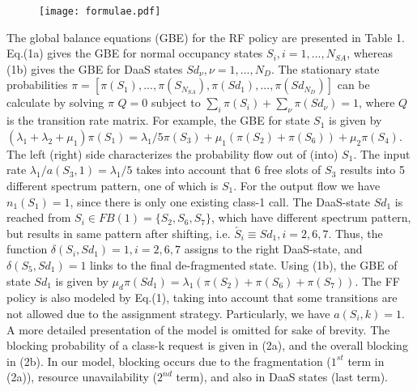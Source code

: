 \documentclass[letterpaper,10pt]{article}
\begin{document}
\vspace{-3mm}
\begin{figure}[ht!]
 \centering
\texttt{[image: formulae.pdf]}
\label{table:formulae}\vspace{-7mm}
\end{figure}
The global balance equations (GBE) for the RF policy are presented in Table 1. Eq.(1a) gives the GBE for normal occupancy states $S_i, i=1,...,N_{SA}$, whereas (1b) gives the GBE for DaaS states $Sd_\nu, \nu=1,...,N_D$. The stationary state probabilities  $\pi = [ \pi(S_1),...,\pi(S_{N_{SA}}), \pi(Sd_1),...,\pi(Sd_{N_D})]$ can be calculate by solving $\pi$ $Q=0$ subject to $\sum_i \pi(S_i)+\sum_\nu \pi(Sd_\nu)=1 $, where $Q$ is the transition rate matrix. For example, the GBE for state $S_1$ is given by $(\lambda_1 + \lambda_2 + \mu_1)\pi(S_1) = \lambda_1/5 \pi(S_3)+ \mu_1(\pi(S_2)+\pi(S_6)) +\mu_2\pi(S_4)$. The left (right) side characterizes the probability flow out of (into) $S_1$. The input rate $\lambda_1/a(S_3,1)=\lambda_1/5$ takes into account that 6 free slots of $S_3$ results into 5 different spectrum pattern, one of which is $S_1$. For the output flow we have $n_1(S_1)=1$, since there is only one existing class-1 call. The DaaS-state $Sd_1$ is reached from $S_i \in FB(1)=\{S_2,S_6,S_7\}$, which have different spectrum pattern, but results in same pattern after shifting, i.e. $\overleftarrow{S_i}\equiv  Sd_1, i = 2,6,7$. Thus, the function $\delta(S_i,Sd_1)=1, i=2,6,7$ assigns to the right DaaS-state, and $\delta(S_5,Sd_1)=1$ links to the final de-fragmented state. Using (1b), the GBE of state $Sd_1$ is given by $\mu_d \pi(Sd_1)=\lambda_1 (\pi(S_2)+\pi(S_6)+\pi(S_7))$. The FF policy is also modeled by Eq.(1), taking into account that some transitions are not allowed due to the assignment strategy. Particularly, we have $a(S_i,k) = 1$. A more detailed presentation of the model is omitted for sake of brevity. The blocking probability of a class-k request is given in (2a), and the overall blocking in (2b). In our model, blocking occurs due to the fragmentation ($1^{st}$ term in (2a)), resource unavailability ($2^{nd}$ term), and also in DaaS states (last term).
 
\vspace{-2mm}
\end{document}

